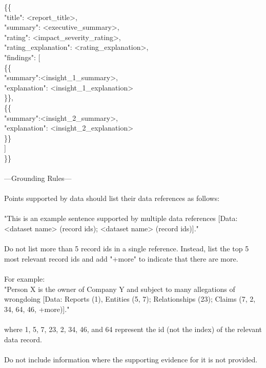 \documentclass{article}
\begin{document}
{    \{\{\\
        "title": <report\_title>,\\
        "summary": <executive\_summary>,\\
        "rating": <impact\_severity\_rating>,\\
        "rating\_explanation": <rating\_explanation>,\\
        "findings": [\\
            \{\{\\
                "summary":<insight\_1\_summary>,\\
                "explanation": <insight\_1\_explanation>\\
            \}\},\\
            \{\{\\
                "summary":<insight\_2\_summary>,\\
                "explanation": <insight\_2\_explanation>\\
            \}\}\\
        ]\\
    \}\}\\
\\
---Grounding Rules---\\
\\
Points supported by data should list their data references as follows:\\
\\
"This is an example sentence supported by multiple data references [Data: <dataset name> (record ids); <dataset name> (record ids)]."\\
\\
Do not list more than 5 record ids in a single reference. Instead, list the top 5 most relevant record ids and add "+more" to indicate that there are more.\\
\\
For example:\\
"Person X is the owner of Company Y and subject to many allegations of wrongdoing [Data: Reports (1), Entities (5, 7); Relationships (23); Claims (7, 2, 34, 64, 46, +more)]."\\
\\
where 1, 5, 7, 23, 2, 34, 46, and 64 represent the id (not the index) of the relevant data record.\\
\\
Do not include information where the supporting evidence for it is not provided.\\
\\
}
\end{document}
